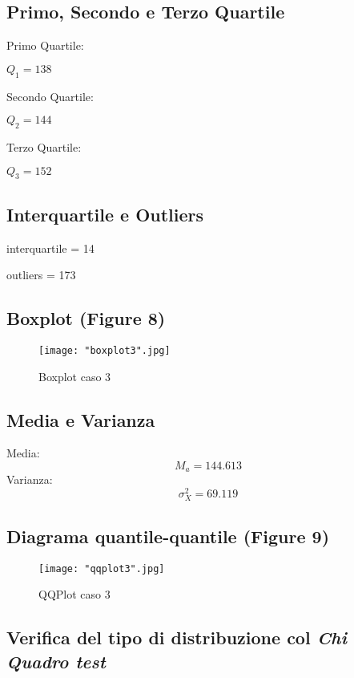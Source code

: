 \documentclass[a4paper]{article}
\begin{document}
\subsection{Primo, Secondo e Terzo Quartile}
Primo Quartile:
\begin{center}
	$Q_1= 138$
\end{center}
Secondo Quartile:
\begin{center}
	$Q_2= 144$
\end{center}
Terzo Quartile:
\begin{center}
	$Q_3= 152$
\end{center}


\subsection{Interquartile e Outliers}
\begin{center}
	interquartile = 14
\end{center}
\begin{center}
	outliers = 173
\end{center}

\subsection{Boxplot (Figure 8)}
\begin{figure}[htp]
	\centering
	\texttt{[image: "boxplot3".jpg]}
	\caption{Boxplot caso 3}
	\label{}
\end{figure}

\subsection{Media e Varianza}
Media: 
\begin{equation}
	M_{a} = 144.613
\end{equation}
Varianza: 
\begin{equation}
	\sigma _{X}^{2} = 69.119
\end{equation}

\subsection{Diagrama quantile-quantile (Figure 9)}
\begin{figure}[htp]
	\centering
	\texttt{[image: "qqplot3".jpg]}
	\caption{QQPlot caso 3}
	\label{}
\end{figure}

\subsection{Verifica del tipo di distribuzione col \emph{Chi Quadro test}}
\end{document}

